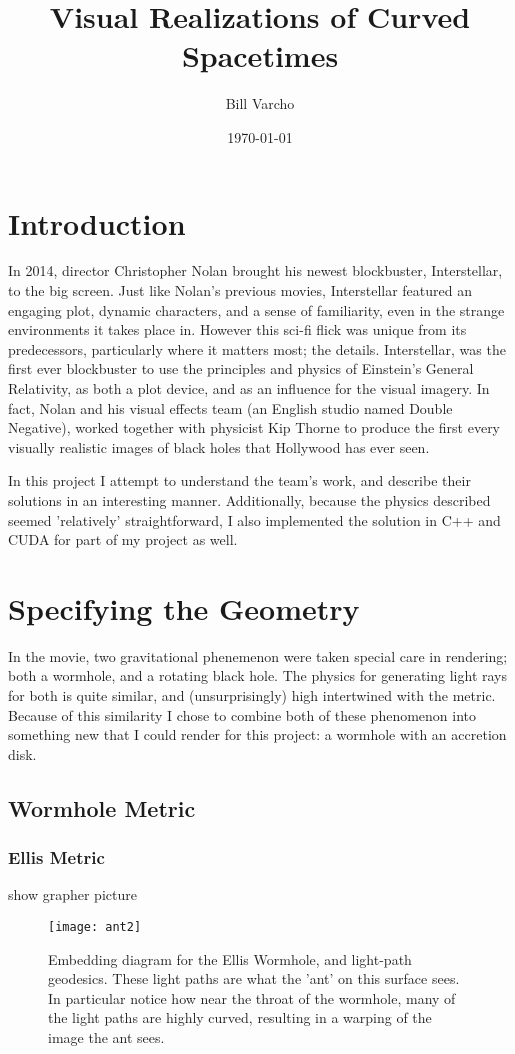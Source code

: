 \documentclass{article}
\begin{document}
\title{\textbf{Visual Realizations of Curved Spacetimes}}
\date{\today}
\author{Bill Varcho}
\maketitle

\section{Introduction}
	In 2014, director Christopher Nolan brought his newest blockbuster, Interstellar, to the big screen. Just like Nolan's previous movies, Interstellar featured an engaging plot, dynamic characters, and a sense of familiarity, even in the strange environments it takes place in. However this sci-fi flick was unique from its predecessors, particularly where it matters most; the details. Interstellar, was the first ever blockbuster to use the principles and physics of Einstein's General Relativity, as both a plot device, and as an influence for the visual imagery. In fact, Nolan and his visual effects team (an English studio named Double Negative), worked together with physicist Kip Thorne to produce the first every visually realistic images of black holes that Hollywood has ever seen. \par
	In this project I attempt to understand the team's work, and describe their solutions in an interesting manner. Additionally, because the physics described seemed 'relatively' straightforward, I also implemented the solution in C++ and CUDA for part of my project as well. 
\section{Specifying the Geometry}
In the movie, two gravitational phenemenon were taken special care in rendering; both a wormhole, and a rotating black hole. The physics for generating light rays for both is quite similar, and (unsurprisingly) high intertwined with the metric. Because of this similarity I chose to combine both of these phenomenon into something new that I could render for this project: a wormhole with an accretion disk.
\subsection{Wormhole Metric}
\subsubsection{Ellis Metric}
show grapher picture
\begin{figure}[H]
  \centering
  \texttt{[image: ant2]}
  \caption{Embedding diagram for the Ellis Wormhole, and light-path geodesics. These light paths are what the 'ant' on this surface sees. In particular notice how near the throat of the wormhole, many of the light paths are highly curved, resulting in a warping of the image the ant sees.}
  \label{fig:mine}
\end{figure}
\end{document}
